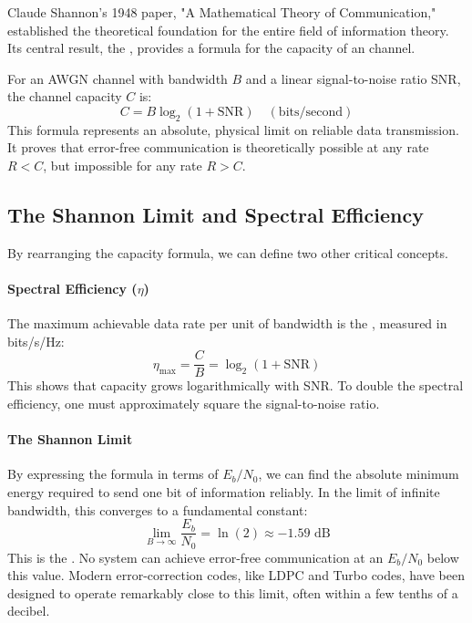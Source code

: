 Claude Shannon's 1948 paper, "A Mathematical Theory of Communication," established the theoretical foundation for the entire field of information theory. Its central result, the , provides a formula for the capacity of an  channel.

\begin{keyconcept}
    For an AWGN channel with bandwidth $B$ and a linear signal-to-noise ratio SNR, the channel capacity $C$ is:
    \[ C = B \log_2(1 + \text{SNR}) \quad (\text{bits/second}) \]
    This formula represents an absolute, physical limit on reliable data transmission. It proves that error-free communication is theoretically possible at any rate $R < C$, but impossible for any rate $R > C$.
\end{keyconcept}


\subsection{The Shannon Limit and Spectral Efficiency}

By rearranging the capacity formula, we can define two other critical concepts.

\paragraph{Spectral Efficiency ($\eta$)}
The maximum achievable data rate per unit of bandwidth is the , measured in bits/s/Hz:
\begin{equation}
    \eta_{\max} = \frac{C}{B} = \log_2(1 + \text{SNR})
\end{equation}
This shows that capacity grows logarithmically with SNR. To double the spectral efficiency, one must approximately square the signal-to-noise ratio.

\paragraph{The Shannon Limit}
By expressing the formula in terms of $E_b/N_0$, we can find the absolute minimum energy required to send one bit of information reliably. In the limit of infinite bandwidth, this converges to a fundamental constant:
\begin{equation}
    \lim_{B \to \infty} \frac{E_b}{N_0} = \ln(2) \approx -1.59 \text{ dB}
\end{equation}
This is the . No system can achieve error-free communication at an $E_b/N_0$ below this value. Modern error-correction codes, like LDPC and Turbo codes, have been designed to operate remarkably close to this limit, often within a few tenths of a decibel.


